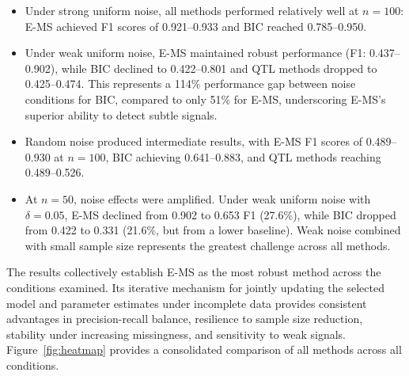 \documentclass[
  12pt,
]{article}
\begin{document}
\begin{itemize}
    \item Under strong uniform noise, all methods performed 
    relatively well at $n = 100$: E-MS achieved F1 scores of 0.921--0.933 
    and BIC reached 0.785--0.950.

    \item Under weak uniform noise, E-MS maintained robust 
    performance (F1: 0.437--0.902), while BIC declined to 0.422--0.801 
    and QTL methods dropped to 0.425--0.474. This represents a 114\% 
    performance gap between noise conditions for BIC, compared to only 
    51\% for E-MS, underscoring E-MS's superior ability to detect subtle 
    signals.

    \item Random noise produced intermediate results, with E-MS 
    F1 scores of 0.489--0.930 at $n = 100$, BIC achieving 0.641--0.883, 
    and QTL methods reaching 0.489--0.526.

    \item At $n = 50$, noise effects were amplified. Under weak 
    uniform noise with $\delta = 0.05$, E-MS declined from 0.902 to 0.653 
    F1 (27.6\%), while BIC dropped from 0.422 to 0.331 (21.6\%, but from 
    a lower baseline). Weak noise combined with small sample size represents 
    the greatest challenge across all methods.
\end{itemize}


The results collectively establish E-MS as the most robust method across the conditions examined. Its iterative mechanism for jointly updating the selected model and parameter estimates under incomplete data provides consistent advantages in precision-recall balance, resilience to sample size reduction, stability under increasing missingness, and sensitivity to weak signals. Figure~\ref{fig:heatmap} provides a consolidated comparison of all methods across all conditions.


\end{document}
